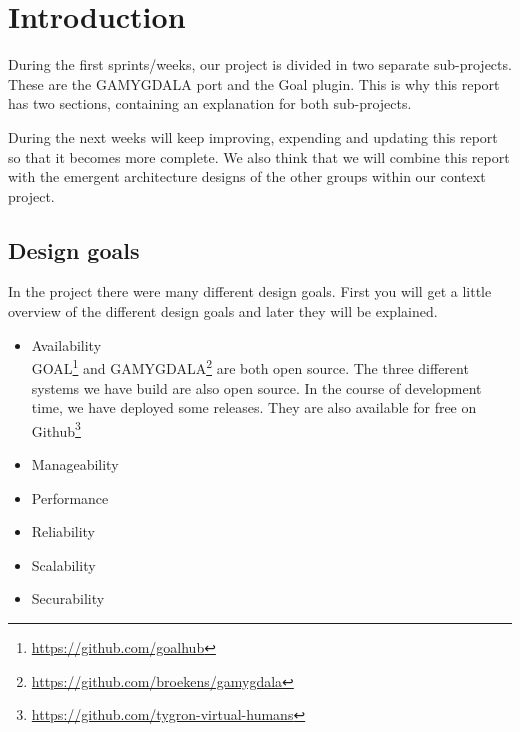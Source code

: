 \section{Introduction} 
During the first sprints/weeks, our project is divided in two separate sub-projects. These are the GAMYGDALA port and the Goal plugin. This is why this report has two sections, containing an explanation for both sub-projects. \\ \par
During the next weeks will keep improving, expending and updating this report so that it becomes more complete. We also think that we will combine this report with the emergent architecture designs of the other groups within our context project.

\subsection{Design goals}
In the project there were many different design goals. First you will get a little overview of the different design goals and later they will be explained.

\begin{itemize}
\item Availability
\\GOAL\footnote{\url{https://github.com/goalhub}} and GAMYGDALA\footnote{\url{https://github.com/broekens/gamygdala}} are both open source. The three different systems we have build are also open source. In the course of development time, we have deployed some releases. They are also available for free on Github\footnote{\url{https://github.com/tygron-virtual-humans}}
\item Manageability
\item Performance
\item Reliability
\item Scalability
\item Securability
\end{itemize}